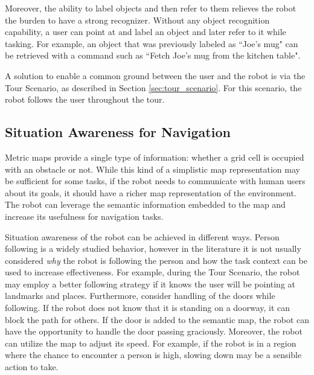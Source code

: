 Moreover, the ability to label objects and then refer to them relieves the robot the burden to have a strong recognizer. Without any object recognition capability, a user can point at and label an object and later refer to it while tasking. For example, an object that was previously labeled as ``Joe's mug" can be retrieved with a command such as ``Fetch Joe's mug from the kitchen table".

A solution to enable a common ground between the user and the robot is via the Tour Scenario, as described in Section \ref{sec:tour_scenario}. For this scenario, the robot follows the user throughout the tour.

\subsection{Situation Awareness for Navigation}

Metric maps provide a single type of information: whether a grid cell is occupied with an obstacle or not. While this kind of a simplistic map representation may be sufficient for some tasks, if the robot needs to communicate with human users about its goals, it should have a richer map representation of the environment. The robot can leverage the semantic information embedded to the map and increase its usefulness for navigation tasks. %


Situation awareness of the robot can be achieved in different ways. Person following is a widely studied behavior, however in the literature it is not usually considered \textit{why} the robot is following the person and how the task context can be used to increase effectiveness. For example, during the Tour Scenario, the robot may employ a better following strategy if it knows the user will be pointing at landmarks and places. Furthermore, consider handling of the doors while following. If the robot does not know that it is standing on a doorway, it can block the path for others. If the door is added to the semantic map, the robot can have the opportunity to handle the door passing graciously. Moreover, the robot can utilize the map to adjust its speed. For example, if the robot is in a region where the chance to encounter a person is high, slowing down may be a sensible action to take.





